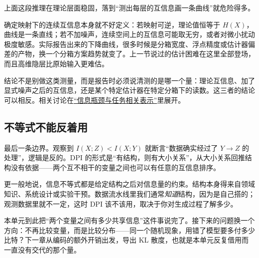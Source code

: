 上面这段推理在理论层面稳固，落到``测出每层的互信息画一条曲线''就危险得多。

确定映射下的连续互信息本身就不好定义：若映射可逆，理论值恒等于 \(H(X)\)，曲线是一条直线；若不加噪声，连续空间上的互信息可能取无穷，或者对微小扰动极度敏感。实际报告出来的下降曲线，很多时候是分箱宽度、浮点精度或估计器偏差的产物，换一个分箱方案趋势就变了。上一节说过的估计困难在这里全部登场，而且高维隐层比原始输入更难估。

结论不是别做这类测量，而是报告时必须说清测的是哪一个量：理论互信息、加了显式噪声之后的互信息，还是某个特定估计器在特定分箱下的读数。这三者的结论可以相反。相关讨论在\hyperref[sec:07-Information-Theory/06-Information-and-Learning/03]{``信息瓶颈与任务相关表示''}里展开。

\subsection{不等式不能反着用}

最后一条边界。观察到 \(I(X;Z)<I(X;Y)\) 就断言``数据确实经过了 \(Y\to Z\) 的处理''，逻辑是反的。DPI 的形式是``有结构，则有大小关系''，从大小关系回推结构没有依据——两个互不相干的变量之间也可以有任意的互信息排序。

更一般地说，信息不等式都是给定结构之后对信息量的约束。结构本身得来自领域知识、系统设计或实验干预。数据流水线里我们通常\emph{知道}结构，因为是自己搭的；观测数据里就不一定，这时 DPI 该不该用，取决于你对生成过程了解多少。

本单元到此把``两个变量之间有多少共享信息''这件事说完了。接下来的问题换一个方向：不再比较变量，而是比较分布——同一个随机现象，用错了模型要多付多少比特？下一章从编码的额外开销出发，导出 KL 散度，也就是本单元反复借用而一直没有交代的那个量。
